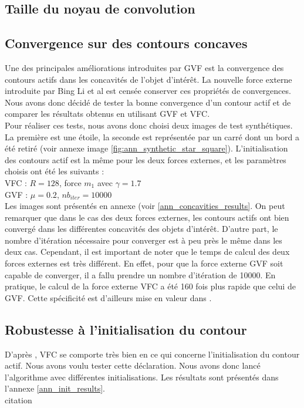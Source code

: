 \subsection{Taille du noyau de convolution}
\subsection{Convergence sur des contours concaves}
Une des principales améliorations introduites par GVF est la convergence des contours actifs dans les concavités de l'objet d'intérêt. La nouvelle force externe introduite par Bing Li et al est censée conserver ces propriétés de convergences. Nous avons donc décidé de tester la bonne convergence d'un contour actif et de comparer les résultats obtenus en utilisant GVF et VFC.\\ %

Pour réaliser ces tests, nous avons donc choisi deux images de test synthétiques. La première est une étoile, la seconde est représentée par un carré dont un bord a été retiré (voir annexe image \ref{fig:ann_synthetic_star_square}). L'initialisation des contours actif est la même pour les deux forces externes, et les paramètres choisis ont été les suivants :\\

VFC : $R = 128$, force $m_{1}$ avec $\gamma = 1.7$\\
GVF : $\mu = 0.2$, $nb_{iter} = 10000$\\

Les images sont présentés en annexe (voir \ref{ann_concavities_results}. On peut remarquer que dans le cas des deux forces externes, les contours actifs ont bien convergé dans les différentes concavités des objets d'intérêt. D'autre part, le nombre d'itération nécessaire pour converger est à peu près le même dans les deux cas. Cependant, il est important de noter que le temps de calcul des deux forces externes est très différent. En effet, pour que la force externe GVF soit capable de converger, il a fallu prendre un nombre d'itération de 10000. En pratique, le calcul de la force externe VFC a été 160 fois plus rapide que celui de GVF. Cette spécificité est d'ailleurs mise en valeur dans \cite{vfc}. 

\subsection{Robustesse à l'initialisation du contour}
D'après \cite{vfc}, VFC se comporte très bien en ce qui concerne l'initialisation du contour actif. Nous avons voulu tester cette déclaration. Nous avons donc lancé l'algorithme avec différentes initialisations. Les résultats sont présentés dans l'annexe \ref{ann_init_results}.\\ citation

